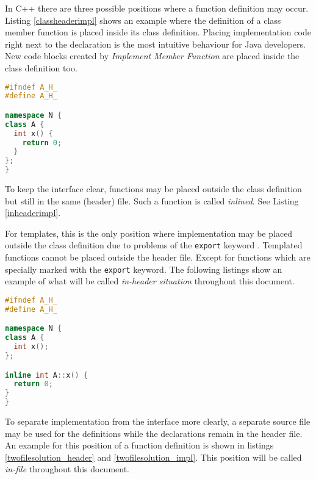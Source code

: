 \label{positions}
In C++ there are three possible positions where a
function definition may occur. Listing \ref{classheaderimpl} shows an example
where the definition of a class member function is placed inside its class
definition. Placing implementation code right next to the declaration is the
most intuitive behaviour for Java developers. New code blocks created by
\textit{Implement Member Function} are placed inside the class definition too.

\begin{lstlisting}[caption={In-class implementation in A.h},
label={classheaderimpl}, language=C++ ]
#ifndef A_H_
#define A_H_

namespace N {
class A {
  int x() {
    return 0;
  }
};
}
\end{lstlisting}

To keep the interface clear, functions may be placed outside the class
definition but still in the same (header) file. Such a function is called
\textit{inlined}. See Listing \ref{inheaderimpl}.\newline

For templates, this is the only position where implementation may be placed
outside the class definition due to problems of the \texttt{export} keyword
\cite{ext03}. Templated functions cannot be placed outside the header file.
Except for functions which are specially marked with the \texttt{export}
keyword. The following listings show an example of what will be called
\textit{in-header situation} throughout this document.

\begin{lstlisting}[caption={In-header implementation in A.h},
label={inheaderimpl}, language=C++ ]
#ifndef A_H_
#define A_H_

namespace N {
class A {
  int x();
};

inline int A::x() {
  return 0;
}
}
\end{lstlisting}

To separate implementation from the interface more clearly, a separate source
file may be used for the definitions while the declarations remain in the header
file. An example for this position of a function definition is shown in listings
\ref{twofilesolution_header} and \ref{twofilesolution_impl}. This position will
be called \textit{in-file} throughout this document.

